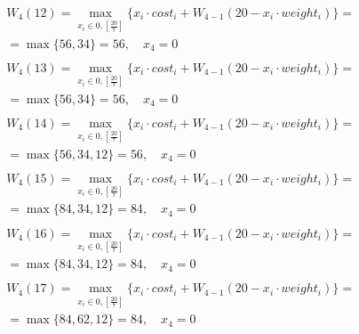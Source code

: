\documentclass[17pt]{extarticle}
\begin{document}
\[
    \begin{aligned}
         & W_4(12)=\max_{x_i \in \overline{0, \left[\frac{20}{7}\right]}} \{x_i \cdot cost_i + W_{4-1}(20 - x_i \cdot weight_i)\}= \\& = \max \{
        56, 34\}= 56, \quad x_4 = 0                                                                                                \\
    \end{aligned}
\]
\[
    \begin{aligned}
         & W_4(13)=\max_{x_i \in \overline{0, \left[\frac{20}{7}\right]}} \{x_i \cdot cost_i + W_{4-1}(20 - x_i \cdot weight_i)\}= \\& = \max \{
        56, 34\}= 56, \quad x_4 = 0                                                                                                \\
    \end{aligned}
\]
\[
    \begin{aligned}
         & W_4(14)=\max_{x_i \in \overline{0, \left[\frac{20}{7}\right]}} \{x_i \cdot cost_i + W_{4-1}(20 - x_i \cdot weight_i)\}= \\& = \max \{
        56, 34, 12\}= 56, \quad x_4 = 0                                                                                            \\
    \end{aligned}
\]
\[
    \begin{aligned}
         & W_4(15)=\max_{x_i \in \overline{0, \left[\frac{20}{7}\right]}} \{x_i \cdot cost_i + W_{4-1}(20 - x_i \cdot weight_i)\}= \\& = \max \{
        84, 34, 12\}= 84, \quad x_4 = 0                                                                                            \\
    \end{aligned}
\]
\[
    \begin{aligned}
         & W_4(16)=\max_{x_i \in \overline{0, \left[\frac{20}{7}\right]}} \{x_i \cdot cost_i + W_{4-1}(20 - x_i \cdot weight_i)\}= \\& = \max \{
        84, 34, 12\}= 84, \quad x_4 = 0                                                                                            \\
    \end{aligned}
\]
\[
    \begin{aligned}
         & W_4(17)=\max_{x_i \in \overline{0, \left[\frac{20}{7}\right]}} \{x_i \cdot cost_i + W_{4-1}(20 - x_i \cdot weight_i)\}= \\& = \max \{
        84, 62, 12\}= 84, \quad x_4 = 0                                                                                            \\
    \end{aligned}
\]
\end{document}
